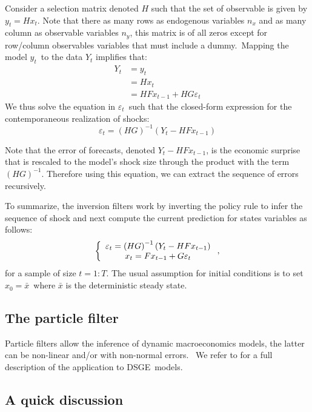\documentclass[a4paper,12pt]{article}%
\begin{document}
Consider a selection matrix denoted $H$ such that the set of observable is
given by $y_{t}=Hx_{t}$. Note that there as many rows as endogenous variables
$n_{x}$ and as many column as observable variables $n_{y}$, this matrix is of
all zeros except for row/column observables variables that must include a
dummy.\ Mapping the model $y_{t}$\ to the data $Y_{t}$ implifies that:%
\begin{align*}
Y_{t}  &  =y_{t}\\
&  =Hx_{t}\\
&  =HFx_{t-1}+HG\varepsilon_{t}%
\end{align*}
We thus solve the equation in $\varepsilon_{t}$\ such that the closed-form
expression for the contemporaneous realization of shocks:%
\begin{equation}
\varepsilon_{t}=\left(  HG\right)  ^{-1}\left(  Y_{t}-HFx_{t-1}\right)
\label{eq 4}%
\end{equation}


Note that the error of forecasts, denoted $Y_{t}-HFx_{t-1}$, is the economic
surprise that is rescaled to the model's shock size through the product with
the term $\left(  HG\right)  ^{-1}$. Therefore using this equation, we can
extract the sequence of errors recursively.

To summarize, the inversion filters work by inverting the policy rule to infer
the sequence of shock and next compute the current prediction for states
variables as follows:%
\[
\left\{
\begin{array}
[c]{c}%
\varepsilon_{t}=\left(  HG\right)  ^{-1}\left(  Y_{t}-HFx_{t-1}\right) \\
x_{t}=Fx_{t-1}+G\varepsilon_{t}%
\end{array}
\right.  ,
\]
for a sample of size $t=1:T$. The usual assumption for initial conditions is
to set $x_{0}=\bar{x}$\ where $\bar{x}$ is the deterministic steady state.

\subsection{The particle filter}

Particle filters allow the inference of dynamic macroeconomics models, the
latter can be non-linear and/or with non-normal errors. \ We refer to
\cite{fernandez2007estimating} for a full description of the application to DSGE\ models.

\subsection{A quick discussion}
\end{document}
